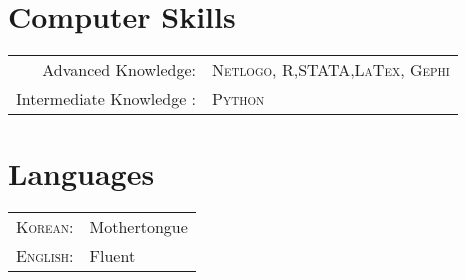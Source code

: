 \documentclass[a4paper,10pt]{article}
\begin{document}


 


\section{Computer Skills}
\begin{tabular}{rl}
Advanced Knowledge: & \textsc{Netlogo}, \textsc{R},\textsc{STATA},\textsc{LaTex}, \textsc{Gephi}\\ 
 
Intermediate Knowledge :  & \textsc{Python} \\


\end{tabular}



\section{Languages}
\begin{tabular}{rl}
 \textsc{Korean:}&Mothertongue\\
\textsc{English:}&Fluent\\

\end{tabular}

\end{document}
